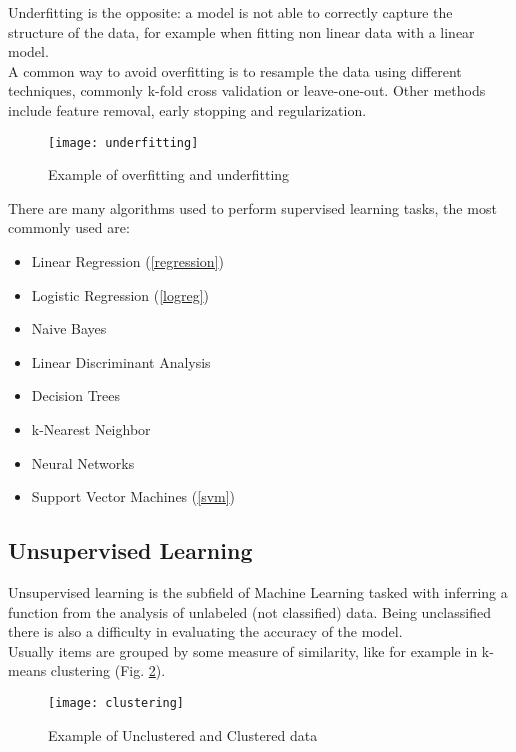 \begin{itemize}
	Underfitting is the opposite: a model is not able to correctly capture the structure of the data, for example when fitting non linear data with a linear model. \\
	A common way to avoid overfitting is to resample the data using different techniques, commonly k-fold cross validation or leave-one-out. Other methods include feature removal, early stopping and regularization.
	
	\begin{figure}[H]
		\centering
		\texttt{[image: underfitting]}
		\caption{Example of overfitting and underfitting \cite{underfitting}}
		\label{fig:underfitting}
	\end{figure}
\end{itemize}

There are many algorithms used to perform supervised learning tasks, the most commonly used are:

\begin{itemize}[noitemsep, topsep = -5pt]
	\item Linear Regression (\ref{regression})
	\item Logistic Regression (\ref{logreg})
	\item Naive Bayes
	\item Linear Discriminant Analysis
	\item Decision Trees
	\item k-Nearest Neighbor
	\item Neural Networks
	\item Support Vector Machines (\ref{svm})
\end{itemize}

\subsection{Unsupervised Learning} \label{unsupervised}
Unsupervised learning is the subfield of Machine Learning tasked with inferring a function from the analysis of unlabeled (not classified) data. Being unclassified there is also a difficulty in evaluating the accuracy of the model.\\
Usually items are grouped by some measure of similarity, like for example in k-means clustering (Fig. \ref{fig:clustering}).

\begin{figure}[H]
	\centering
	\texttt{[image: clustering]}
	\caption{Example of Unclustered and Clustered data \cite{kmeans}}
	\label{fig:clustering}
\end{figure}	


